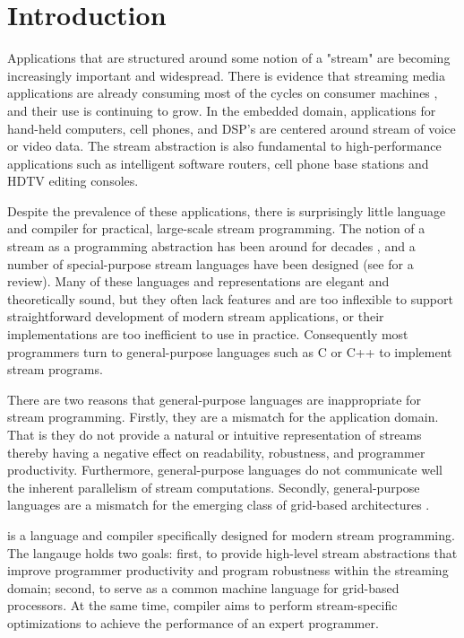 \section{Introduction}

Applications that are structured around some notion of a "stream"
are becoming increasingly important and widespread.  There is
evidence that streaming media applications are already consuming
most of the cycles on consumer machines \cite{Rix98}, and their
use is continuing to grow.  In the embedded domain, applications
for hand-held computers, cell phones, and DSP's are centered
around stream of voice or video data.  The stream abstraction is
also fundamental to high-performance applications such as
intelligent software routers, cell phone base stations and HDTV
editing consoles.

Despite the prevalence of these applications, there is
surprisingly little language and compiler for practical,
large-scale stream programming.  The notion of a stream as a
programming abstraction has been around for decades \cite{SICP},
and a number of special-purpose stream languages have been
designed (see \cite{survey97} for a review). Many of these
languages and representations are elegant and theoretically sound,
but they often lack features and are too inflexible to support
straightforward development of modern stream applications, or
their implementations are too inefficient to use in practice.
Consequently most programmers turn to general-purpose languages
such as C or C++ to implement stream programs.

There are two reasons that general-purpose languages are
inappropriate for stream programming.  Firstly, they are a
mismatch for the application domain.  That is they do not provide
a natural or intuitive representation of streams thereby having a
negative effect on readability, robustness, and programmer
productivity.  Furthermore, general-purpose languages do not
communicate well the inherent parallelism of stream computations.
 Secondly, general-purpose languages are a mismatch for the
emerging class of grid-based architectures
\cite{smartmemories,rawshort,trips}.

{\StreamIt} is a language and compiler specifically designed for
modern stream programming.  The {\StreamIt} langauge holds two
goals: first, to provide high-level stream abstractions that
improve programmer productivity and program robustness within the
streaming domain; second, to serve as a common machine language
for grid-based processors.  At the same time, {\StreamIt} compiler
aims to perform stream-specific optimizations to achieve the
performance of an expert programmer.

